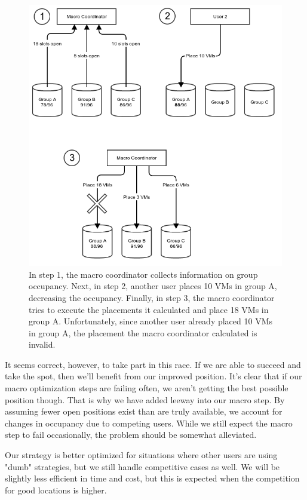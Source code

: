 \documentclass[11pt]{article}
\begin{document}
\begin{figure}
  \centering
\includegraphics[scale=0.7]{macrodelay.png}

 \caption{  In step 1, the macro coordinator collects information on group occupancy.  Next, in step 2, another user places 10 VMs in group A, decreasing the occupancy.  Finally, in step 3, the macro coordinator tries to execute the placements it calculated and place 18 VMs in group A.  Unfortunately, since another user already placed 10 VMs in group A, the placement the macro coordinator calculated is invalid. }

\end{figure}

It seems correct, however, to take part in this race. If we are able to succeed and take the spot, then we’ll benefit from our improved position.  It’s clear that if our macro optimization steps are failing often, we aren't getting the best possible position though.  That is why we have added leeway into our macro step.  By assuming fewer open positions exist than are truly available, we account for changes in occupancy due to competing users. While we still expect the macro step to fail occasionally, the problem should be somewhat alleviated. 

Our strategy is better optimized for situations where other users are using "dumb" strategies, but we still handle competitive cases as well. We will be slightly less efficient in time and cost, but this is expected when the competition for good locations is higher.
\end{document}
